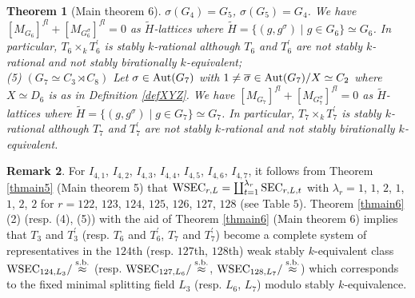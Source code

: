 \documentclass{amsart}
\theoremstyle{plain}
\newtheorem{theorem}{Theorem}[section]
\theoremstyle{definition}
\newtheorem{remark}[theorem]{Remark}
\theoremstyle{remark}
\newcommand{\bZ}{\mathbbm{Z}}\newcommand{\bQ}{\mathbbm{Q}}
\newcommand{\GL}{{\rm GL}}\newcommand{\SL}{{\rm SL}}
\begin{document}
\begin{theorem}[Main theorem 6]
$\sigma(G_4)=G_5$, $\sigma(G_5)=G_4$. 
We have 
$[M_{G_6}]^{fl}+[M_{G_6^\sigma}]^{fl}=0$ as $\widetilde{H}$-lattices 
where $\widetilde{H}=\{(g,g^\sigma)\mid g\in G_6\}\simeq G_6$. 
In particular, $T_6\times_k T_6^\prime$ is stably $k$-rational 
although $T_6$ and $T_6^\prime$ are not stably $k$-rational and not stably birationally $k$-equivalent;\\
{\rm (5)} $(G_7\simeq C_3\rtimes C_8)$ Let $\sigma\in {\rm Aut}(G_7)$ with 
$1\neq\overline{\sigma}\in {\rm Aut}(G_7)/X\simeq C_2$ 
where %
$X\simeq D_6$ is as in Definition \ref{defXYZ}. 
We have 
$[M_{G_7}]^{fl}+[M_{G_7^\sigma}]^{fl}=0$ as $\widetilde{H}$-lattices 
where $\widetilde{H}=\{(g,g^\sigma)\mid g\in G_7\}\simeq G_7$. 
In particular, $T_7\times_k T_7^\prime$ is stably $k$-rational 
although $T_7$ and $T_7^\prime$ are not stably $k$-rational and not stably birationally $k$-equivalent. 
\end{theorem}
%
\begin{remark}
For $I_{4,1}$, $I_{4,2}$, $I_{4,3}$, $I_{4,4}$, $I_{4,5}$, $I_{4,6}$, 
$I_{4,7}$, it follows from Theorem \ref{thmain5} (Main theorem 5) that 
${\rm WSEC}_{r,L}=
\coprod_{t=1}^{\lambda_{r}} {\rm SEC}_{r,L,t}$ with 
$\lambda_r=1$, $1$, $2$, $1$, $1$, $2$, $2$ for 
$r=122$, $123$, $124$, $125$, $126$, $127$, $128$ 
(see Table $5$). 
Theorem \ref{thmain6} (2) (resp. (4), (5)) 
with the aid of Theorem \ref{thmain6} (Main theorem 6) 
implies that $T_3$ and $T_3^\prime$ 
(resp. $T_6$ and $T_6^\prime$, $T_7$ and $T_7^\prime$) 
become a complete system of representatives 
in the $124$th (resp. $127$th, $128$th) weak stably $k$-equivalent class 
${\rm WSEC}_{124,L_3}/\stackrel{\rm s.b.}{\approx}$ 
(resp. ${\rm WSEC}_{127,L_6}/\stackrel{\rm s.b.}{\approx}$, 
${\rm WSEC}_{128,L_7}/\stackrel{\rm s.b.}{\approx}$) 
which corresponds to the fixed minimal splitting field $L_3$ 
(resp. $L_6$, $L_7$) modulo stably $k$-equivalence. 
\end{remark}
\end{document}
